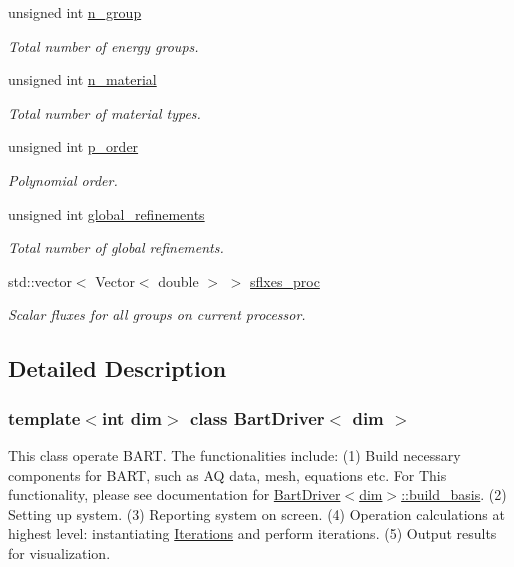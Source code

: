 \begin{DoxyCompactItemize}
unsigned int \hyperlink{class_bart_driver_aeb5a04392c80b32379b02e18acbc1126}{n\+\_\+group}
\begin{DoxyCompactList}\small\item\em Total number of energy groups. \end{DoxyCompactList}\item 
unsigned int \hyperlink{class_bart_driver_ae6c9141662b95c89b674ccdc04e9233f}{n\+\_\+material}
\begin{DoxyCompactList}\small\item\em Total number of material types. \end{DoxyCompactList}\item 
unsigned int \hyperlink{class_bart_driver_ae6d782d30c28d741bb0df46251087809}{p\+\_\+order}
\begin{DoxyCompactList}\small\item\em Polynomial order. \end{DoxyCompactList}\item 
unsigned int \hyperlink{class_bart_driver_a1ddb881c78ef92c59f2c686b320c970e}{global\+\_\+refinements}
\begin{DoxyCompactList}\small\item\em Total number of global refinements. \end{DoxyCompactList}\item 
std\+::vector$<$ Vector$<$ double $>$ $>$ \hyperlink{class_bart_driver_a560ae94f3801fb64a35fdbcd0d8a772d}{sflxes\+\_\+proc}
\begin{DoxyCompactList}\small\item\em Scalar fluxes for all groups on current processor. \end{DoxyCompactList}\end{DoxyCompactItemize}


\subsection{Detailed Description}
\subsubsection*{template$<$int dim$>$\newline
class Bart\+Driver$<$ dim $>$}

This class operate B\+A\+RT. The functionalities include\+: (1) Build necessary components for B\+A\+RT, such as AQ data, mesh, equations etc. For This functionality, please see documentation for \hyperlink{class_bart_driver_ade375a4999de1e775434e11d4e6dd935}{Bart\+Driver$<$dim$>$\+::build\+\_\+basis}. (2) Setting up system. (3) Reporting system on screen. (4) Operation calculations at highest level\+: instantiating \hyperlink{class_iterations}{Iterations} and perform iterations. (5) Output results for visualization. 

